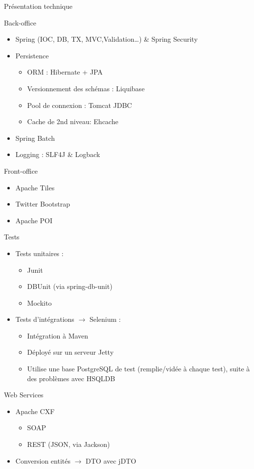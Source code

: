 \begin{frame}
	\begin{center}
		 \huge{Pr\'esentation technique}
	\end{center}
\end{frame}

\begin{frame}{Back-office}
	\begin{itemize}
		\item Spring (IOC, DB, TX, MVC,Validation\ldots) \& Spring Security
		\item Persistence
		\begin{itemize}
			\item ORM : Hibernate + JPA 
			\item Versionnement des sch\'emas : Liquibase
			\item Pool de connexion : Tomcat JDBC			
			\item Cache de 2nd niveau: Ehcache
		\end{itemize}
		\item Spring Batch
		\item Logging : SLF4J \& Logback
	\end{itemize}
\end{frame}

\begin{frame}{Front-office}	
	\begin{itemize}
		\item Apache Tiles
		\item Twitter Bootstrap
		\item Apache POI
	\end{itemize}
\end{frame}

\begin{frame}{Tests}
	\begin{itemize}
		\item Tests unitaires : 
			\begin{itemize}
				\item Junit
				\item DBUnit (via spring-db-unit)
				\item Mockito
			\end{itemize}
		\item Tests d'intégrations $\rightarrow$ Selenium :
			\begin{itemize}
				\item Int\'egration \`a Maven
				\item D\'eploy\'e sur un serveur Jetty
				\item Utilise une base PostgreSQL de test (remplie/vid\'ee \`a chaque test), suite \`a des probl\`emes avec HSQLDB
			\end{itemize}
	\end{itemize}
\end{frame}

\begin{frame}{Web Services}
	\begin{itemize}
		\item Apache CXF
		\begin{itemize}
			\item SOAP
			\item REST (JSON, via Jackson)
		\end{itemize}
		\item Conversion entit\'es $\rightarrow$ DTO avec jDTO
	\end{itemize}
\end{frame}
